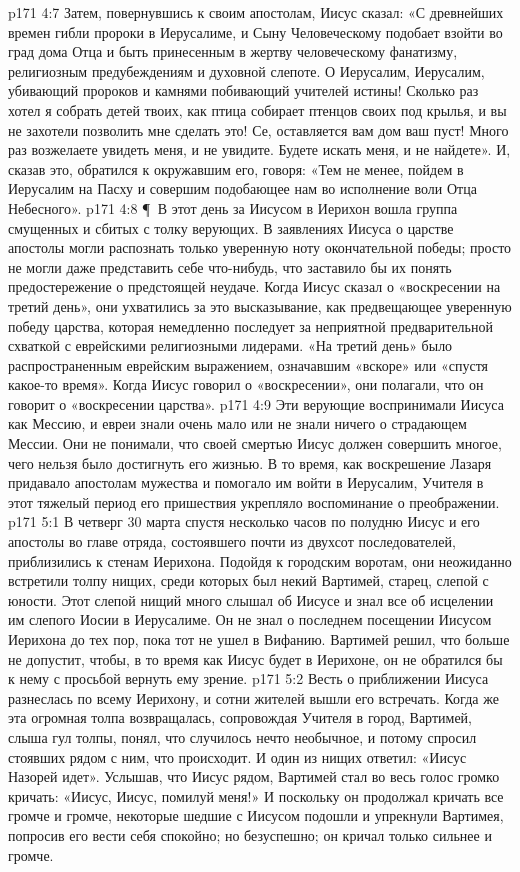 \vs p171 4:7 Затем, повернувшись к своим апостолам, Иисус сказал: «С древнейших времен гибли пророки в Иерусалиме, и Сыну Человеческому подобает взойти во град дома Отца и быть принесенным в жертву человеческому фанатизму, религиозным предубеждениям и духовной слепоте. О Иерусалим, Иерусалим, убивающий пророков и камнями побивающий учителей истины! Сколько раз хотел я собрать детей твоих, как птица собирает птенцов своих под крылья, и вы не захотели позволить мне сделать это! Се, оставляется вам дом ваш пуст! Много раз возжелаете увидеть меня, и не увидите. Будете искать меня, и не найдете». И, сказав это, обратился к окружавшим его, говоря: «Тем не менее, пойдем в Иерусалим на Пасху и совершим подобающее нам во исполнение воли Отца Небесного».
\vs p171 4:8 \P\ В этот день за Иисусом в Иерихон вошла группа смущенных и сбитых с толку верующих. В заявлениях Иисуса о царстве апостолы могли распознать только уверенную ноту окончательной победы; просто не могли даже представить себе что\hyp{}нибудь, что заставило бы их понять предостережение о предстоящей неудаче. Когда Иисус сказал о «воскресении на третий день», они ухватились за это высказывание, как предвещающее уверенную победу царства, которая немедленно последует за неприятной предварительной схваткой с еврейскими религиозными лидерами. «На третий день» было распространенным еврейским выражением, означавшим «вскоре» или «спустя какое\hyp{}то время». Когда Иисус говорил о «воскресении», они полагали, что он говорит о «воскресении царства».
\vs p171 4:9 Эти верующие воспринимали Иисуса как Мессию, и евреи знали очень мало или не знали ничего о страдающем Мессии. Они не понимали, что своей смертью Иисус должен совершить многое, чего нельзя было достигнуть его жизнью. В то время, как воскрешение Лазаря придавало апостолам мужества и помогало им войти в Иерусалим, Учителя в этот тяжелый период его пришествия укрепляло воспоминание о преображении.
\vs p171 5:1 В четверг 30 марта спустя несколько часов по полудню Иисус и его апостолы во главе отряда, состоявшего почти из двухсот последователей, приблизились к стенам Иерихона. Подойдя к городским воротам, они неожиданно встретили толпу нищих, среди которых был некий Вартимей, старец, слепой с юности. Этот слепой нищий много слышал об Иисусе и знал все об исцелении им слепого Иосии в Иерусалиме. Он не знал о последнем посещении Иисусом Иерихона до тех пор, пока тот не ушел в Вифанию. Вартимей решил, что больше не допустит, чтобы, в то время как Иисус будет в Иерихоне, он не обратился бы к нему с просьбой вернуть ему зрение.
\vs p171 5:2 Весть о приближении Иисуса разнеслась по всему Иерихону, и сотни жителей вышли его встречать. Когда же эта огромная толпа возвращалась, сопровождая Учителя в город, Вартимей, слыша гул толпы, понял, что случилось нечто необычное, и потому спросил стоявших рядом с ним, что происходит. И один из нищих ответил: «Иисус Назорей идет». Услышав, что Иисус рядом, Вартимей стал во весь голос громко кричать: «Иисус, Иисус, помилуй меня!» И поскольку он продолжал кричать все громче и громче, некоторые шедшие с Иисусом подошли и упрекнули Вартимея, попросив его вести себя спокойно; но безуспешно; он кричал только сильнее и громче.
